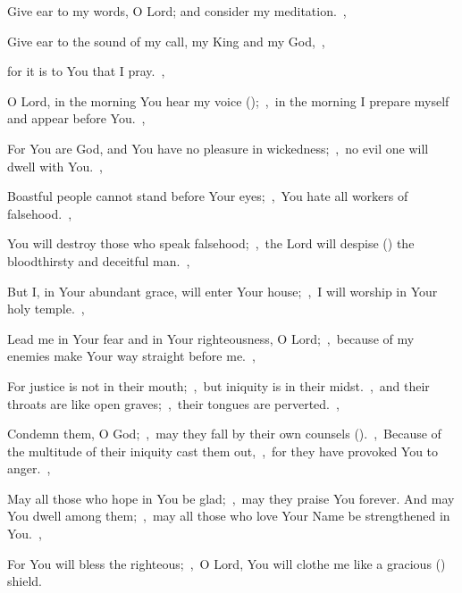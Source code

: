 \documentclass[12pt,twoside,a5paper]{article}
\begin{document}



\begin{normalparskip}
  Give ear to my words, O Lord; and consider my meditation.~\sep

  Give ear to the sound of my call, my King and my God,~\sep


  for it is to You that I pray.~\sep

  O Lord, in the morning You hear my voice ();~\sep\ in the morning I prepare myself and appear before You.~\sep

  For You are God, and You have no pleasure in wickedness;~\sep\ no evil one will dwell with You.~\sep

  Boastful people cannot stand before Your eyes;~\sep\ You hate all workers of falsehood.~\sep

  You will destroy those who speak falsehood;~\sep\ the Lord will despise () the bloodthirsty and deceitful man.~\sep

  But I, in Your abundant grace, will enter Your house;~\sep\ I will worship in Your holy temple.~\sep

  Lead me in Your fear and in Your righteousness, O Lord;~\sep\ because of my enemies make Your way straight before me.~\sep

  For justice is not in their mouth;~\sep\ but iniquity is in their midst.~\sep\ and their throats are like open graves;~\sep\ their tongues are perverted.~\sep

  Condemn them, O God;~\sep\ may they fall by their own counsels ().~\sep\ Because of the multitude of their iniquity cast them out,~\sep\ for they have provoked You to anger.~\sep

  May all those who hope in You be glad;~\sep\ may they praise You forever. And may You dwell among them;~\sep\ may all those who love Your Name be strengthened in You.~\sep

  For You will bless the righteous;~\sep\ O Lord, You will clothe me like a gracious () shield.
\end{normalparskip}
\end{document}
